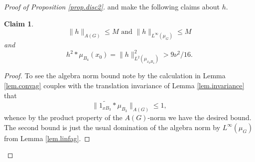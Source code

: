 \documentclass[12pt]{amsart}
\numberwithin{equation}{section}
\theoremstyle{plain}
\newtheorem*{claim}{Claim}
\theoremstyle{definition}
\renewcommand{\leq}{\leqslant}
\begin{document}
\begin{proof}[Proof of Proposition \ref{prop.disc2}]
and make the following claims about $h$.
\begin{claim}
\begin{equation*}
\|h\|_{A(G)} \leq M \textrm{ and } \|h\|_{L^\infty(\mu_G)} \leq M
\end{equation*}
and
\begin{equation}\label{eqn.big}
h^2 \ast \mu_{B_4}(x_0)=\|h\|_{L^2(\mu_{x_0B_4})}^2 > 9\nu^2/16.
\end{equation}
\end{claim}
\begin{proof}
To see the algebra norm bound note by the calculation in Lemma \ref{lem.convag} couples with the translation invariance of Lemma \ref{lem.invariance} that
\begin{equation*}
\|\widetilde{1_{xB_3}} \ast  \mu_{B_3}\|_{A(G)} \leq 1,
\end{equation*}
whence by the product property of the $A(G)$-norm we have the desired bound.  The second bound is just the usual domination of the algebra norm by $L^\infty(\mu_G)$ from Lemma \ref{lem.linfag}.


\end{proof}
\end{proof}
\end{document}

